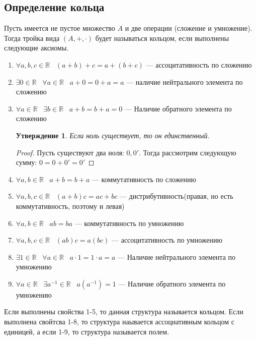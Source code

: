\documentclass[12pt, a4paper]{article}
\newcommand{\re}{\mathds{R}}
\theoremstyle{plain}
\newtheorem*{Statement*}{Утверждение}
\theoremstyle{definition}
\begin{document}
\subsection*{Определение кольца}
Пусть имеется не пустое множество $A$ и две операции (сложение и умножение). Тогда тройка вида $(A, +, \cdot)$ будет называться кольцом, если выполнены следующие аксиомы.
\begin{enumerate}
    \item $\forall a,b,c \in \re \;\;\;(a+b)+c = a+(b+c)$ --- ассоцитативность по сложению
    \item $\exists 0 \in \re\;\;\; \forall a\in \re\;\;\; a+0=0+a=a$ --- наличие нейтрального элемента по сложению
    \item $\forall a \in \re \;\;\; \exists b\in\re \;\;\; a+b=b+a=0$ --- Наличие обратного элемента по сложению
    
    
    \begin{Statement*}
        Если ноль существует, то он единственный.
    \end{Statement*}
    \begin{proof}
        Пусть существуют два ноля: $0,0'$. Тогда рассмотрим следующую сумму:
        $0 = 0 + 0' = 0'$
    \end{proof}
    
    \item $\forall a,b \in \re \;\;\; a+b = b+a$ --- коммутативность по сложению
    \item  $\forall a,b,c \in \re \;\;\;(a+b)c = ac+bc$ --- дистрибутивность(правая, но есть коммутативность, поэтому и левая)
    \item $\forall a,b \in \re \;\;\; ab = ba$ --- коммутативность по умножению
    \item  $\forall a,b,c \in \re \;\;\;(ab)c = a(bc)$ --- ассоцитативность по умножению
    \item  $\exists 1 \in \re\;\;\; \forall a\in \re\;\;\; a\cdot1=1\cdot a=a$ --- Наличие нейтрального элемента по умножению
    \item  $\forall a \in \re \;\;\; \exists a^{-1}\in\re \;\;\; a(a^{-1})=1$ --- Наличие обратного элемента по умножению
        
\end{enumerate}
Если выполнены свойства 1-5, то данная структура называется кольцом. Если выполнена свойтсва 1-8, то структура наывается ассоциативным кольцом с единицей, а если 1-9, то структура называется полем.
\end{document}
